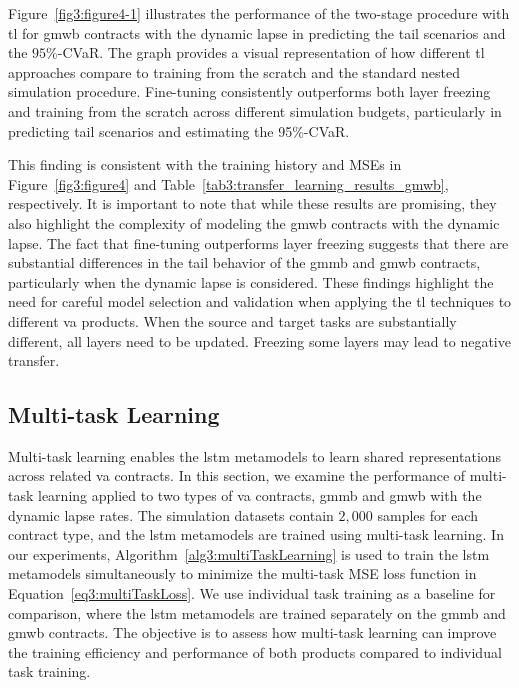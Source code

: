 Figure~\ref{fig3:figure4-1} illustrates the performance of the two-stage procedure with \gls{tl} for \gls{gmwb} contracts with the dynamic lapse in predicting the tail scenarios and the $95\%$-CVaR.
The graph provides a visual representation of how different \gls{tl} approaches compare to training from the scratch and the standard nested simulation procedure.
Fine-tuning consistently outperforms both layer freezing and training from the scratch across different simulation budgets, particularly in predicting tail scenarios and estimating the 95\%-CVaR. 

This finding is consistent with the training history and MSEs in Figure~\ref{fig3:figure4} and Table~\ref{tab3:transfer_learning_results_gmwb}, respectively.
It is important to note that while these results are promising, they also highlight the complexity of modeling the \gls{gmwb} contracts with the dynamic lapse. 
The fact that fine-tuning outperforms layer freezing suggests that there are substantial differences in the tail behavior of the \gls{gmmb} and \gls{gmwb} contracts, particularly when the dynamic lapse is considered. 
These findings highlight the need for careful model selection and validation when applying the \gls{tl} techniques to different \gls{va} products.
When the source and target tasks are substantially different, all layers need to be updated.
Freezing some layers may lead to negative transfer.


\subsection{Multi-task Learning}

Multi-task learning enables the \gls{lstm} metamodels to learn shared representations across related \gls{va} contracts.
In this section, we examine the performance of multi-task learning applied to two types of \gls{va} contracts, \gls{gmmb} and \gls{gmwb} with the dynamic lapse rates.
The simulation datasets contain $2,\!000$ samples for each contract type, and the \gls{lstm} metamodels are trained using multi-task learning. 
In our experiments, Algorithm~\ref{alg3:multiTaskLearning} is used to train the \gls{lstm} metamodels simultaneously to minimize the multi-task MSE loss function in Equation~\eqref{eq3:multiTaskLoss}.
We use individual task training as a baseline for comparison, where the \gls{lstm} metamodels are trained separately on the \gls{gmmb} and \gls{gmwb} contracts.
The objective is to assess how multi-task learning can improve the training efficiency and performance of both products compared to individual task training.

